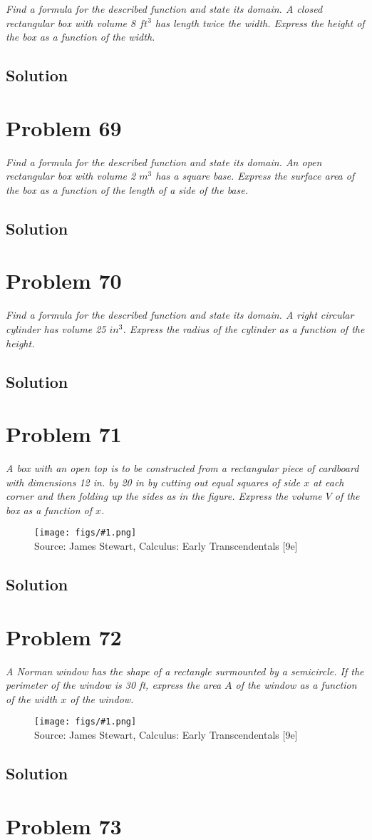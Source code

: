 \documentclass[11pt]{article}
\newcommand{\soln}{\subsection*}
\newcommand{\qn}{\textit}
\newcommand{\imagesource}[1]{{\footnotesize Source: #1}}
\newcommand{\imgqn}[1]{
	\begin{figure}[h]
		\centering
		\texttt{[image: figs/\#1.png]}\\
		\imagesource{James Stewart, Calculus: Early Transcendentals [9e]}
	\end{figure}
}
\begin{document}
\qn{Find a formula for the described function and state its domain. A closed rectangular box with volume 8 $ft^3$ has length twice the width. Express the height of the box as a function of the width.}

\soln{Solution}

\section*{Problem 69}

\qn{Find a formula for the described function and state its domain. An open rectangular box with volume 2 $m^3$ has a square base. Express the surface area of the box as a function of the length of a side of the base.}

\soln{Solution}

\section*{Problem 70}

\qn{Find a formula for the described function and state its domain. A right circular cylinder has volume 25 $in^3$. Express the radius of the cylinder as a function of the height.}

\soln{Solution}

\section*{Problem 71}

\qn{A box with an open top is to be constructed from a rectangular piece of cardboard with dimensions 12 in. by 20 in by cutting out equal squares of side $x$ at each corner and then folding up the sides as in the figure. Express the volume $V$ of the box as a function of $x$.}

\imgqn{1.1.71}

\soln{Solution}

\section*{Problem 72}

\qn{A Norman window has the shape of a rectangle surmounted by a semicircle. If the perimeter of the window is 30 ft, express the area $A$ of the window as a function of the width $x$ of the window.}

\imgqn{1.1.72}

\soln{Solution}

\section*{Problem 73}
\end{document}
